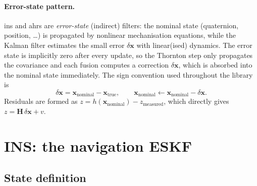 \documentclass[11pt,a4paper]{article}
\newcommand{\vect}[1]{\bm{#1}}
\newcommand{\mat}[1]{\bm{#1}}
\begin{document}
\paragraph{Error-state pattern.}
ins and ahrs are \emph{error-state} (indirect) filters: the nominal
state (quaternion, position, \dots) is propagated by nonlinear
mechanisation equations, while the Kalman filter estimates the small
error $\delta\vect{x}$ with linear(ised) dynamics. The error state is
implicitly zero after every update, so the Thornton step only propagates
the covariance and each fusion computes a correction
$\delta\vect{x}$, which is absorbed into the nominal state immediately.
The sign convention used throughout the library is
\begin{equation}
  \delta\vect{x} = \vect{x}_{\text{nominal}} - \vect{x}_{\text{true}},
  \qquad
  \vect{x}_{\text{nominal}} \leftarrow \vect{x}_{\text{nominal}}
  - \delta\vect{x} .
  \label{eq:signconv}
\end{equation}
Residuals are formed as $z = h(\vect{x}_{\text{nominal}}) -
z_{\text{measured}}$, which directly gives $z = \mat{H}\,\delta\vect{x} + v$.

\section{INS: the navigation ESKF}

\subsection{State definition}
\end{document}
